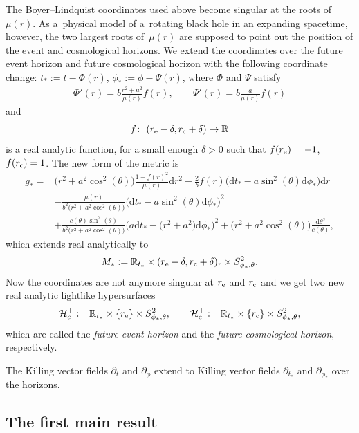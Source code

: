 \documentclass[10pt,a4paper]{amsart}
\newcommand{\de}{\delta}
\renewcommand{\d}{\partial}
\newcommand{\Ho}{\mathcal H}
\newcommand{\md}{\mathrm d}
\newcommand{\R}[0]{\mathbb{R}}
\numberwithin{equation}{section}
\begin{document}
The Boyer--Lindquist coordinates used above become singular at the roots of $\mu(r)$.
As a~physical model of a~rotating black hole in an expanding spacetime, however, the two largest roots of~$\mu(r)$ are supposed to point out the position of the event and cosmological horizons.
We extend the coordinates over the future event horizon and future cosmological horizon with the following coordinate change: $t_*:= t - \Phi(r)$, $\phi_*:= \phi - \Psi(r)$,
where $\Phi$ and $\Psi$ satisfy
\begin{align*}
		\Phi'(r)
			= b \frac{r^2 + a^2}{\mu(r)} f(r), \qquad
		\Psi'(r)
			= b \frac a{\mu(r)} f(r)
\end{align*}
and
\[
	f\colon\ (r_{\rm e} - \de, r_{\rm c} + \de) \to \R
\]
is a real analytic function, for a small enough $\de > 0$ such that $f(r_{\rm e})
		= -1$, $f(r_{\rm c}) = 1$.
The new form of the metric is
\begin{align*}%
	g_*
		={}& \big(r^2 + a^2 \cos^2(\theta)\big)\frac{1 - f(r)^2}{\mu(r)} \md r^2 - \frac 2 b f(r) \big(\md t_* - a \sin^2(\theta) \md \phi_*\big)\md r \\
		& - \frac{\mu(r)}{b^2\big(r^2 + a^2 \cos^2(\theta)\big)}\big(\md t_* - a \sin^2(\theta) \md \phi_* \big)^2 \\
		& + \frac{c(\theta)\sin^2(\theta)}{b^2\big(r^2 + a^2 \cos^2(\theta)\big)}\big(a\md t_* - \big(r^2 + a^2\big) \md \phi_*\big)^2 + \big(r^2 + a^2 \cos^2(\theta)\big)\frac{\md \theta^2}{c(\theta)},
\end{align*}
which extends real analytically to
\[
	M_*
		:= \R_{t_*} \times (r_{\rm e} - \de, r_{\rm c} + \de)_r \times S^2_{\phi_*, \theta}.
\]
Now the coordinates are not anymore singular at $r_{\rm e}$ and $r_{\rm c}$ and we get two new real analytic lightlike hypersurfaces
\begin{align*}
	\Ho_e^+
		:= \R_{t_*} \times \{r_{\rm e}\} \times S^2_{\phi_*, \theta}, \qquad
	\Ho_c^+
		:= \R_{t_*} \times \{r_{\rm c}\} \times S^2_{\phi_*, \theta},
\end{align*}
which are called the \emph{future event horizon} and the \emph{future cosmological horizon}, respectively.

\begin{Remark}
The Killing vector fields $\d_t$ and $\d_\phi$ extend to Killing vector fields $\d_{t_*}$ and $\d_{\phi_*}$ over the horizons.
\end{Remark}

\subsection{The first main result}
\end{document}
